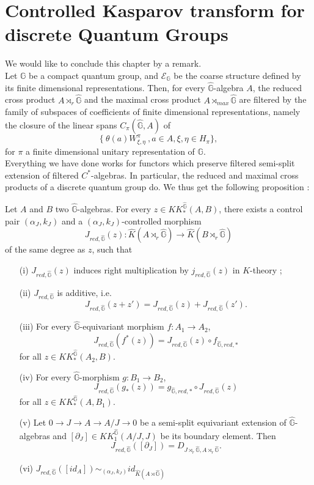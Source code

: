 \section{Controlled Kasparov transform for discrete Quantum Groups}

We would like to conclude this chapter by a remark. \\

Let $\mathbb G$ be a compact quantum group, and $\mathcal E_{\mathbb G}$ be the coarse structure defined by its finite dimensional representations. Then, for every $\hat{\mathbb G}$-algebra $A$, the reduced cross product $A\rtimes_r \hat{\mathbb G}$ and the maximal cross product $A\rtimes_{max}\hat{\mathbb G}$ are filtered by the family of subspaces of coefficients of finite dimensional representations, namely the closure of the linear spans $C_{\pi}(\hat{\mathbb G},A)$ of
\[\{ \ \theta(a)W^\pi_{\xi,\eta} \ , a\in A, \xi,\eta\in H_\pi\},\]
for $\pi$ a finite dimensional unitary representation of $\mathbb G$.\\

Everything we have done works for functors which preserve filtered semi-split extension of filtered $C^*$-algebras. In particular, the reduced and maximal cross products of a discrete quantum group do. We thus get the following proposition :

\begin{prop}
Let $A$ and $B$ two $\hat{\mathbb G}$-algebras. For every $z\in KK^{\hat{\mathbb G}}_*(A,B)$, there exists a control pair $(\alpha_J,k_J)$ and a $(\alpha_J,k_J)$-controlled morphism
\[J_{red,\hat{\mathbb G}}(z) : \hat K(A\rtimes_r \hat{\mathbb G})\rightarrow \hat K(B\rtimes_r \hat{\mathbb G})\]
of the same degree as $z$, such that
\begin{enumerate}
\item[(i)] $J_{red,\hat{\mathbb G}}(z)$ induces right multiplication by $j_{red,\hat{\mathbb G}}(z)$ in $K$-theory ;
\item[(ii)] $J_{red,\hat{\mathbb G}}$ is additive, i.e.
\[J_{red,\hat{\mathbb G}}(z+z')=J_{red,\hat{\mathbb G}}(z)+J_{red,\hat{\mathbb G}}(z').\]
\item[(iii)] For every $\hat{\mathbb G}$-equivariant morphism $f : A_1\rightarrow A_2$,
\[J_{red,\hat{\mathbb G}}(f^*(z))=J_{red,\hat{\mathbb G}}(z)\circ f_{\hat{\mathbb G},red,*}\] for all $z\in KK_*^{\hat{\mathbb G}}(A_2,B)$.
\item[(iv)] For every $\hat{\mathbb G}$-morphism $g : B_1\rightarrow B_2$,
\[J_{red,\hat{\mathbb G}}(g_*(z))= g_{\hat{\mathbb G},red,*}\circ J_{red,\hat{\mathbb G}}(z)\] for all $z\in KK_*^{\hat{\mathbb G}}(A,B_1)$.
\item[(v)] Let $0\rightarrow J\rightarrow A\rightarrow A/J\rightarrow 0$ be a semi-split equivariant extension of $\hat{\mathbb G}$-algebras and $[\partial_J]\in KK_1^{\hat{\mathbb G}}(A/J,J)$ be its boundary element. Then 
\[J_{red,\hat{\mathbb G}}([\partial_J])=D_{J\rtimes_r \hat{\mathbb G},A\rtimes_r \hat{\mathbb G}}.\] 
\item[(vi)] $J_{red,\hat{\mathbb G}}([id_A]) \sim_{(\alpha_J,k_J)} id_{\hat K(A\rtimes \hat{\mathbb G})}$
\end{enumerate}
\end{prop}

